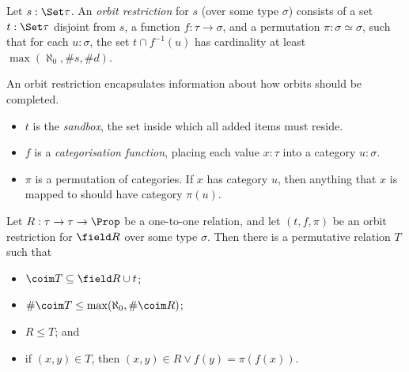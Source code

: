 \begin{definition}
  \label{def:OrbitRestriction}
  \leanok
  Let \( s : \Set \tau \).
  An \emph{orbit restriction} for \( s \) (over some type \( \sigma \)) consists of a set \( t : \Set \tau \) disjoint from \( s \), a function \( f : \tau \to \sigma \), and a permutation \( \pi : \sigma \simeq \sigma \), such that for each \( u : \sigma \), the set \( t \cap f^{-1}(u) \) has cardinality at least \( \max(\aleph_0, \#s, \#d) \).

  An orbit restriction encapsulates information about how orbits should be completed.
  \begin{itemize}
    \item \( t \) is the \emph{sandbox}, the set inside which all added items must reside.
    \item \( f \) is a \emph{categorisation function}, placing each value \( x : \tau \) into a category \( u : \sigma \).
    \item \( \pi \) is a permutation of categories. If \( x \) has category \( u \), then anything that \( x \) is mapped to should have category \( \pi(u) \).
  \end{itemize}
\end{definition}
\begin{proposition}
  \label{prop:completing_restricted_orbits}
  \leanok
  Let \( R : \tau \to \tau \to \Prop \) be a one-to-one relation, and let \( (t, f, \pi) \) be an orbit restriction for \( \field R \) over some type \( \sigma \).
  Then there is a permutative relation \( T \) such that
  \begin{itemize}
    \item \( \coim T \subseteq \field R \cup t \);
    \item \( \#\coim T \leq \max(\aleph_0, \#\coim R) \);
    \item \( R \leq T \); and
    \item if \( (x, y) \in T \), then \( (x, y) \in R \vee f(y) = \pi(f(x)) \).
  \end{itemize}
\end{proposition}
